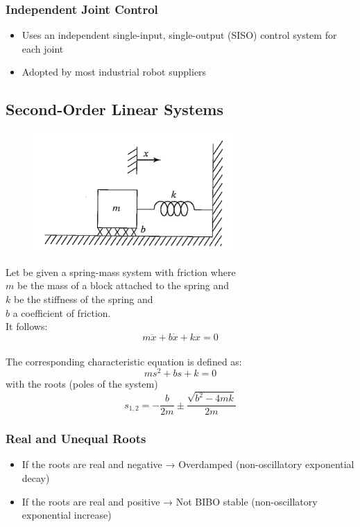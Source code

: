 \documentclass[10pt,a4paper]{article}
\begin{document}
\subsubsection{Independent Joint Control}
\begin{itemize}
	\item Uses an independent single-input, single-output (SISO) control system for each joint
	\item Adopted by most industrial robot suppliers
\end{itemize}

\subsection{Second-Order Linear Systems}
\begin{figure}[H]
	\includegraphics[width=0.5\columnwidth]{imgs/spring_mass.png}
\end{figure}

Let be given a spring-mass system with friction where \\
$m$ be the mass of a block attached to the spring and \\
$k$ be the stiffness of the spring and \\
$b$ a coefficient of friction. \\
It follows:
$$
	m\ddot x + b \dot x + k x = 0
$$
\\

The corresponding characteristic equation is defined as:
$$
	ms^2 + bs + k = 0
$$
with the roots (poles of the system)
$$
	s_{1,2} = - \frac{b}{2m} \pm \frac{\sqrt{b^2 - 4mk}}{2m}
$$

\subsubsection{Real and Unequal Roots}
\begin{itemize}
	\item If the roots are real and negative → Overdamped (non-oscillatory exponential decay)
	\item If the roots are real and positive → Not BIBO stable (non-oscillatory exponential increase)
\end{itemize}
~\\
\end{document}
